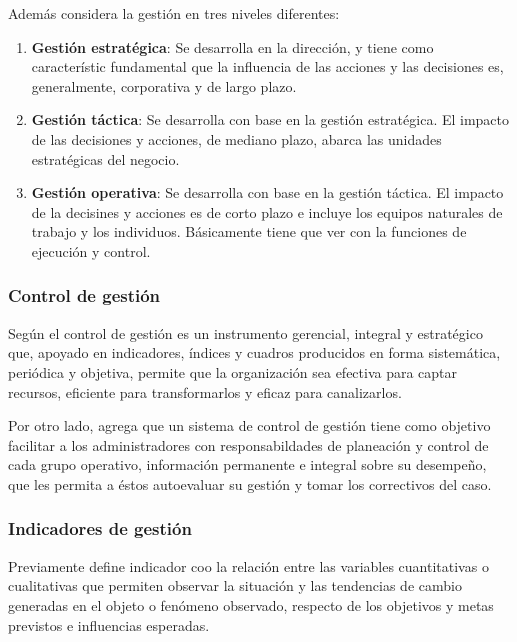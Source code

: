 Adem\'as \cite{beltran} considera la gesti\'on en tres niveles diferentes:
\begin{enumerate}
    \item \textbf{Gesti\'on estrat\'egica}: Se desarrolla en la direcci\'on, y tiene como
          caracter\'istic fundamental que la influencia de las acciones y las decisiones
          es, generalmente, corporativa y de largo plazo.
    \item \textbf{Gesti\'on t\'actica}: Se desarrolla con base en la gesti\'on
          estrat\'egica. El impacto de las decisiones y acciones, de mediano plazo,
          abarca las unidades estrat\'egicas del negocio.
    \item \textbf{Gesti\'on operativa}: Se desarrolla con base en la gesti\'on
          t\'actica. El impacto de la decisines y acciones es de corto plazo e incluye
          los equipos naturales de trabajo y los individuos. B\'asicamente tiene
          que ver con la funciones de ejecuci\'on y control.
\end{enumerate}

\subsubsection{Control de gesti\'on}
Seg\'un \cite{beltran} el control de gesti\'on es un instrumento gerencial, integral
y estrat\'egico que, apoyado en indicadores, \'indices y cuadros producidos en forma
sistem\'atica, peri\'odica y objetiva, permite que la organizaci\'on sea efectiva para
captar recursos, eficiente para transformarlos y eficaz para canalizarlos.

Por otro lado, \cite{beltran} agrega que un sistema de control de gesti\'on tiene
como objetivo facilitar a los administradores con responsabildades de planeaci\'on
y control de cada grupo operativo, informaci\'on permanente e integral sobre su desempe\~no,
que les permita a \'estos autoevaluar su gesti\'on y tomar los correctivos del caso.

\subsubsection{Indicadores de gesti\'on}
Previamente \cite{beltran} define indicador coo la relaci\'on entre las variables
cuantitativas o cualitativas que permiten observar la situaci\'on y las tendencias
de cambio generadas en el objeto o fen\'omeno observado, respecto de los objetivos
y metas previstos e influencias esperadas.

